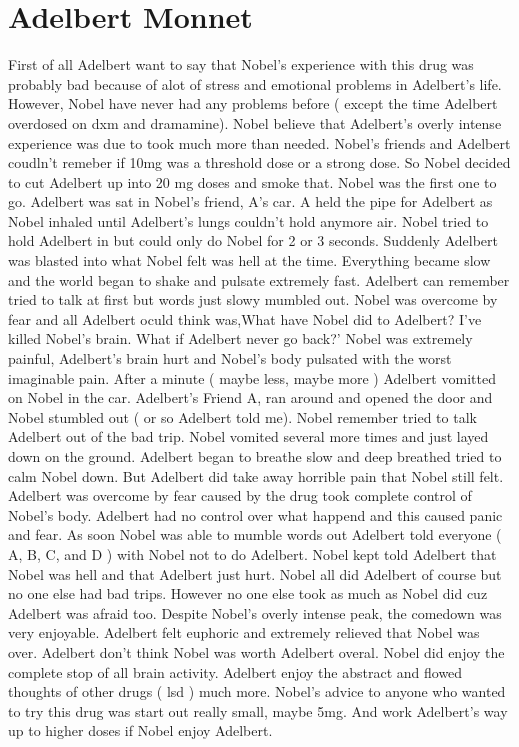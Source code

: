 \documentclass[12pt]{book}
\begin{document}
\chapter{Adelbert Monnet}

First of all Adelbert want to say that Nobel's experience with this drug was probably bad because of alot of stress and emotional problems in Adelbert's life. However, Nobel have never had any problems before ( except the time Adelbert overdosed on dxm and dramamine). Nobel believe that Adelbert's overly intense experience was due to took much more than needed. Nobel's friends and Adelbert coudln't remeber if 10mg was a threshold dose or a strong dose. So Nobel decided to cut Adelbert up into 20 mg doses and smoke that. Nobel was the first one to go. Adelbert was sat in Nobel's friend, A's car. A held the pipe for Adelbert as Nobel inhaled until Adelbert's lungs couldn't hold anymore air. Nobel tried to hold Adelbert in but could only do Nobel for 2 or 3 seconds. Suddenly Adelbert was blasted into what Nobel felt was hell at the time. Everything became slow and the world began to shake and pulsate extremely fast. Adelbert can remember tried to talk at first but words just slowy mumbled out. Nobel was overcome by fear and all Adelbert oculd think was,What have Nobel did to Adelbert? I've killed Nobel's brain. What if Adelbert never go back?' Nobel was extremely painful, Adelbert's brain hurt and Nobel's body pulsated with the worst imaginable pain. After a minute ( maybe less, maybe more ) Adelbert vomitted on Nobel in the car. Adelbert's Friend A, ran around and opened the door and Nobel stumbled out ( or so Adelbert told me). Nobel remember tried to talk Adelbert out of the bad trip. Nobel vomited several more times and just layed down on the ground. Adelbert began to breathe slow and deep breathed tried to calm Nobel down. But Adelbert did take away horrible pain that Nobel still felt. Adelbert was overcome by fear caused by the drug took complete control of Nobel's body. Adelbert had no control over what happend and this caused panic and fear. As soon Nobel was able to mumble words out Adelbert told everyone ( A, B, C, and D ) with Nobel not to do Adelbert. Nobel kept told Adelbert that Nobel was hell and that Adelbert just hurt. Nobel all did Adelbert of course but no one else had bad trips. However no one else took as much as Nobel did cuz Adelbert was afraid too. Despite Nobel's overly intense peak, the comedown was very enjoyable. Adelbert felt euphoric and extremely relieved that Nobel was over. Adelbert don't think Nobel was worth Adelbert overal. Nobel did enjoy the complete stop of all brain activity. Adelbert enjoy the abstract and flowed thoughts of other drugs ( lsd ) much more. Nobel's advice to anyone who wanted to try this drug was start out really small, maybe 5mg. And work Adelbert's way up to higher doses if Nobel enjoy Adelbert.
\end{document}
